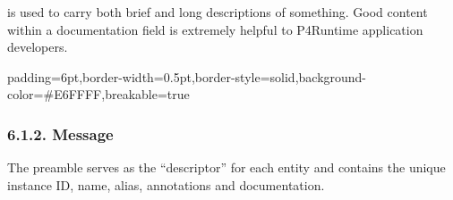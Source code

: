 \documentclass[11pt]{article}
\begin{document}
{%
\noindent{} is used to carry both brief and long descriptions of something.
Good content within a documentation field is extremely helpful to P4Runtime
application developers.%

\begin{mdbmargintb}{6pt}{6pt}%
\begin{mdblock}{padding=6pt,border-width=0.5pt,border-style=solid,background-color=\#E6FFFF,breakable=true}%
\begin{mdpre}%
\end{mdpre}%
\end{mdblock}%
\end{mdbmargintb}%

\subsubsection{6.1.2.\hspace*{0.5em} Message}\label{sec-preamble-message}%

\noindent{}The preamble serves as the \textquotedblleft{}descriptor\textquotedblright{} for each entity and contains the unique
instance ID, name, alias, annotations and documentation.%

}
\end{document}
